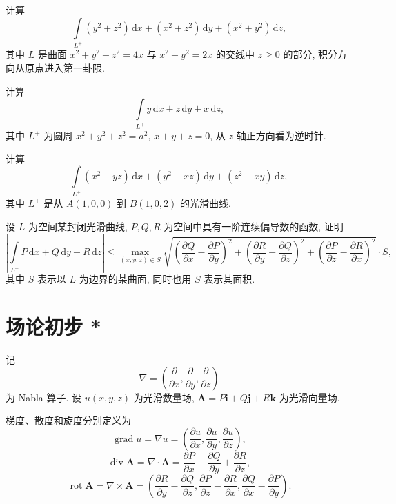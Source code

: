 \documentclass[../数学分析培优讲义.tex]{subfiles}
\begin{document}
\begin{example}
计算
\[
    \int\limits_{L^+}(y^2+z^2)\,\mathrm{d}x+(x^2+z^2)\,\mathrm{d}y+(x^2+y^2)\,\mathrm{d}z,
\]
其中 $L$ 是曲面 $x^2+y^2+z^2=4x$ 与 $x^2+y^2=2x$ 的交线中 $z\geq0$ 的部分, 积分方向从原点进入第一卦限.
\end{example}
\exampleblank

\begin{example}
计算
\[
    \int\limits_{L^+}y\,\mathrm{d}x+z\,\mathrm{d}y+x\,\mathrm{d}z,
\]
其中 $L^+$ 为圆周 $x^2+y^2+z^2=a^2$, $x+y+z=0$, 从 $z$ 轴正方向看为逆时针.
\end{example}
\exampleblank

\begin{example}
计算
\[
    \int\limits_{L^+}(x^2-yz)\,\mathrm{d}x+(y^2-xz)\,\mathrm{d}y+(z^2-xy)\,\mathrm{d}z,
\]
其中 $L^+$ 是从 $A(1,0,0)$ 到 $B(1,0,2)$ 的光滑曲线.
\end{example}
\exampleblank

\begin{example}
设 $L$ 为空间某封闭光滑曲线, $P,Q,R$ 为空间中具有一阶连续偏导数的函数, 证明
\[
\left|\int\limits_{L^+}P\,\mathrm{d}x+Q\,\mathrm{d}y+R\,\mathrm{d}z\right|
\leq
\max_{(x,y,z)\in S}
\sqrt{
\left(\dfrac{\partial Q}{\partial x}-\dfrac{\partial P}{\partial y}\right)^2+
\left(\dfrac{\partial R}{\partial y}-\dfrac{\partial Q}{\partial z}\right)^2+
\left(\dfrac{\partial P}{\partial z}-\dfrac{\partial R}{\partial x}\right)^2}
\cdot S,
\]
其中 $S$ 表示以 $L$ 为边界的某曲面, 同时也用 $S$ 表示其面积.
\end{example}
\exampleblank


\newpage

\section{场论初步 *}

记
\[
    \nabla=\left(\dfrac{\partial}{\partial x},\dfrac{\partial}{\partial y},\dfrac{\partial}{\partial z}\right)
\]
为 Nabla 算子. 设 $u(x,y,z)$ 为光滑数量场, $\bm A=P\bm i+Q\bm j+R\bm k$ 为光滑向量场.

\begin{definition}
梯度、散度和旋度分别定义为
\[
    \operatorname{grad}u=\nabla u
    =\left(\dfrac{\partial u}{\partial x},\dfrac{\partial u}{\partial y},\dfrac{\partial u}{\partial z}\right),
\]
\[
    \operatorname{div}\bm A=\nabla\cdot\bm A
    =\dfrac{\partial P}{\partial x}+\dfrac{\partial Q}{\partial y}+\dfrac{\partial R}{\partial z},
\]
\[
    \operatorname{rot}\bm A=\nabla\times\bm A
    =\left(
    \dfrac{\partial R}{\partial y}-\dfrac{\partial Q}{\partial z},
    \dfrac{\partial P}{\partial z}-\dfrac{\partial R}{\partial x},
    \dfrac{\partial Q}{\partial x}-\dfrac{\partial P}{\partial y}
    \right).
\]
\end{definition}
\end{document}
